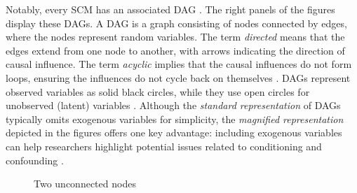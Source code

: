 \documentclass[
  authoryear,
  review,
  1p]{elsarticle}
\begin{document}
Notably, every SCM has an associated DAG
\citep{Pearl_et_al_2016, Cinelli_et_al_2020}. The right panels of the
figures display these DAGs. A DAG is a graph consisting of nodes
connected by edges, where the nodes represent random variables. The term
\emph{directed} means that the edges extend from one node to another,
with arrows indicating the direction of causal influence. The term
\emph{acyclic} implies that the causal influences do not form loops,
ensuring the influences do not cycle back on themselves
\citep{McElreath_2020}. DAGs represent observed variables as solid black
circles, while they use open circles for unobserved (latent) variables
\citep{Morgan_et_al_2014}. Although the \emph{standard representation}
of DAGs typically omits exogenous variables for simplicity, the
\emph{magnified representation} depicted in the figures offers one key
advantage: including exogenous variables can help researchers highlight
potential issues related to conditioning and confounding
\citep{Cinelli_et_al_2020}.

\begin{figure}[H]

\begin{minipage}{0.50\linewidth}

\centering{

\[
\begin{aligned}
  X_{1} & := f_{X1}(e_{X1}) \\
  X_{3} & := f_{X3}(e_{X3}) \\
  e_{X1} & \:\bot\:e_{X3}
\end{aligned}
\]

}


\end{minipage}%
%
\begin{minipage}{0.50\linewidth}



\end{minipage}%

\caption{\label{fig-dags_scms1}Two unconnected nodes}

\end{figure}%
\end{document}
